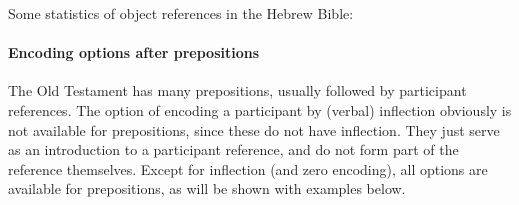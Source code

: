 \documentclass{report}
\begin{document}
Some statistics of object references in the Hebrew Bible:

\noindent
\begin{minipage}{.5\textwidth}

\end{minipage}
\begin{minipage}{.5\textwidth}
\centering

\end{minipage}

\paragraph{Encoding options after prepositions}\label{prep}
The Old Testament has many prepositions, usually followed by participant references. The option of encoding a participant by (verbal) inflection obviously is not available for prepositions, since these do not have inflection. They just serve as an introduction to a participant reference, and do not form part of the reference themselves. Except for inflection (and zero encoding), all options are available for prepositions, as will be shown with examples below.
\end{document}
